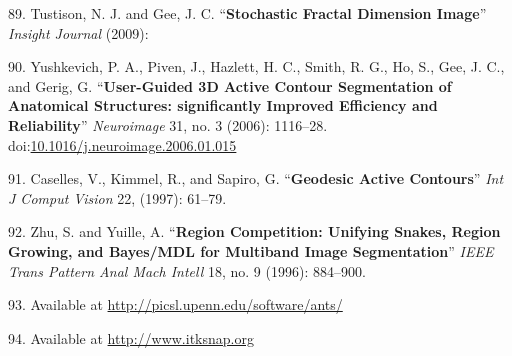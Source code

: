 \documentclass[11pt,]{article}
\begin{document}
89. Tustison, N. J. and Gee, J. C. ``\textbf{Stochastic Fractal
Dimension Image}'' \emph{Insight Journal} (2009):

90. Yushkevich, P. A., Piven, J., Hazlett, H. C., Smith, R. G., Ho, S.,
Gee, J. C., and Gerig, G. ``\textbf{User-Guided 3D Active Contour
Segmentation of Anatomical Structures: significantly Improved Efficiency
and Reliability}'' \emph{Neuroimage} 31, no. 3 (2006): 1116--28.
doi:\href{http://dx.doi.org/10.1016/j.neuroimage.2006.01.015}{10.1016/j.neuroimage.2006.01.015}

91. Caselles, V., Kimmel, R., and Sapiro, G. ``\textbf{Geodesic Active
Contours}'' \emph{Int J Comput Vision} 22, (1997): 61--79.

92. Zhu, S. and Yuille, A. ``\textbf{Region Competition: Unifying
Snakes, Region Growing, and Bayes/MDL for Multiband Image
Segmentation}'' \emph{IEEE Trans Pattern Anal Mach Intell} 18, no. 9
(1996): 884--900.

93. Available at \url{http://picsl.upenn.edu/software/ants/}

94. Available at \url{http://www.itksnap.org}
\end{document}
